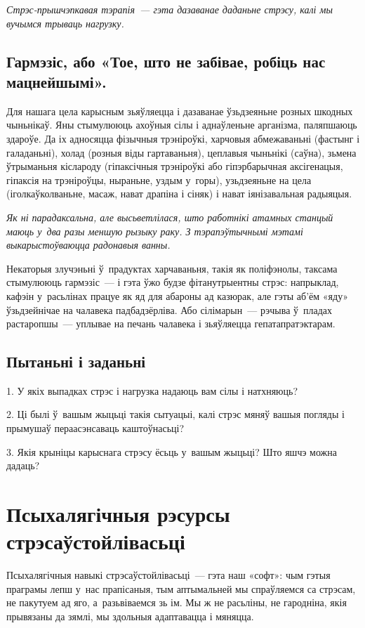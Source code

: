 \emph{Стрэс-прышчэпкавая тэрапія~--- гэта дазаванае даданьне стрэсу, калі мы вучымся трываць нагрузку.}

\subsection*{Гармэзіс, або «Тое, што не забівае, робіць нас мацнейшымі».}

Для нашага цела карысным зьяўляецца і дазаванае ўзьдзеяньне розных шкодных чыньнікаў. Яны стымулююць ахоўныя сілы і аднаўленьне арганізма, паляпшаюць здароўе. Да іх адносяцца фізычныя трэніроўкі, харчовыя абмежаваньні (фастынг і галаданьні), холад (розныя віды гартаваньня), цеплавыя чыньнікі (саўна), зьмена ўтрыманьня кіслароду (гіпаксічныя трэніроўкі або гіпэрбарычная аксігенацыя, гіпаксія на трэніроўцы, ныраньне, уздым у~горы), узьдзеяньне на цела (іголкаўколваньне, масаж, нават драпіна і сіняк) і нават іянізавальная радыяцыя.

\emph{Як ні парадаксальна, але высьветлілася, што работнікі атамных станцый маюць у~два разы меншую рызыку раку. З тэрапэўтычнымі мэтамі выкарыстоўваюцца радонавыя ванны.}

Некаторыя злучэньні ў~прадуктах харчаваньня, такія як поліфэнолы, таксама стымулююць гармэзіс~--- і гэта ўжо будзе фітанутрыентны стрэс: напрыклад, кафэін у~расьлінах працуе як яд для абароны ад казюрак, але гэты аб'ём «яду» ўзьдзейнічае на чалавека падбадзёрліва. Або сілімарын~--- рэчыва ў~пладах растаропшы~--- уплывае на печань чалавека і зьяўляецца гепатапратэктарам.

\subsection*{Пытаньні і заданьні}

1. У якіх выпадках стрэс і нагрузка надаюць вам сілы і натхняюць?

2. Ці былі ў~вашым жыцьці такія сытуацыі, калі стрэс мяняў вашыя погляды і прымушаў пераасэнсаваць каштоўнасьці?

3. Якія крыніцы карыснага стрэсу ёсьць у~вашым жыцьці? Што яшчэ можна дадаць?


\section{Псыхалягічныя рэсурсы стрэсаўстойлівасьці}

Псыхалягічныя навыкі стрэсаўстойлівасьці~--- гэта наш «софт»: чым гэтыя праграмы лепш у~нас прапісаныя, тым аптымальней мы спраўляемся са стрэсам, не пакутуем ад яго, а~разьвіваемся зь ім. Мы ж не расьліны, не гародніна, якія прывязаны да зямлі, мы здольныя адаптавацца і мяняцца.

